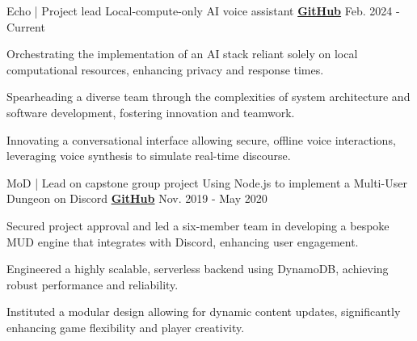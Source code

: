 

\begin{cventries}

\cventry
{Echo | Project lead} %
{Local-compute-only AI voice assistant} %
{\href{https://github.com/JohnnySn0w/Echo}{\textbf{GitHub}}} %
{Feb. 2024 - Current} %
{
  \begin{cvitems} %
    \item{Orchestrating the implementation of an AI stack reliant solely on local computational resources, enhancing privacy and response times.}
    \item{Spearheading a diverse team through the complexities of system architecture and software development, fostering innovation and teamwork.}
    \item{Innovating a conversational interface allowing secure, offline voice interactions, leveraging voice synthesis to simulate real-time discourse.}
  \end{cvitems}
}

\cventry
{MoD | Lead on capstone group project} %
{Using Node.js to implement a Multi-User Dungeon on Discord} %
{\href{https://github.com/JohnnySn0w/MoD}{\textbf{GitHub}}} %
{Nov. 2019 - May 2020} %
{
  \begin{cvitems} %
    \item{Secured project approval and led a six-member team in developing a bespoke MUD engine that integrates with Discord, enhancing user engagement.}
    \item{Engineered a highly scalable, serverless backend using DynamoDB, achieving robust performance and reliability.}
    \item{Instituted a modular design allowing for dynamic content updates, significantly enhancing game flexibility and player creativity.}
  \end{cvitems}
}


\end{cventries}

